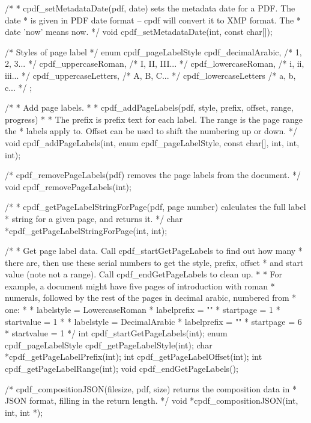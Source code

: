 /*
 * cpdf_setMetadataDate(pdf, date) sets the metadata date for a PDF. The date
 * is given in PDF date format -- cpdf will convert it to XMP format. The
 * date 'now' means now.
 */
void cpdf_setMetadataDate(int, const char[]);

/* Styles of page label */
enum cpdf_pageLabelStyle {
  cpdf_decimalArabic,    /* 1, 2, 3... */
  cpdf_uppercaseRoman,   /* I, II, III... */
  cpdf_lowercaseRoman,   /* i, ii, iii... */
  cpdf_uppercaseLetters, /* A, B, C... */
  cpdf_lowercaseLetters  /* a, b, c... */
};

/*
 * Add page labels.
 *
 * cpdf_addPageLabels(pdf, style, prefix, offset, range, progress)
 *
 * The prefix is prefix text for each label. The range is the page range the
 * labels apply to. Offset can be used to shift the numbering up or down.
 */
void cpdf_addPageLabels(int, enum cpdf_pageLabelStyle, const char[], int, int,
                        int);

/* cpdf_removePageLabels(pdf) removes the page labels from the document. */
void cpdf_removePageLabels(int);

/*
 * cpdf_getPageLabelStringForPage(pdf, page number) calculates the full label
 * string for a given page, and returns it.
 */
char *cpdf_getPageLabelStringForPage(int, int);

/*
 * Get page label data. Call cpdf_startGetPageLabels to find out how many
 * there are, then use these serial numbers to get the style, prefix, offset
 * and start value (note not a range). Call cpdf_endGetPageLabels to clean up.
 *
 * For example, a document might have five pages of introduction with roman
 * numerals, followed by the rest of the pages in decimal arabic, numbered from
 * one:
 *
 * labelstyle = LowercaseRoman
 * labelprefix = ""
 * startpage = 1
 * startvalue = 1
 *
 * labelstyle = DecimalArabic
 * labelprefix = ""
 * startpage = 6
 * startvalue = 1
 */
int cpdf_startGetPageLabels(int);
enum cpdf_pageLabelStyle cpdf_getPageLabelStyle(int);
char *cpdf_getPageLabelPrefix(int);
int cpdf_getPageLabelOffset(int);
int cpdf_getPageLabelRange(int);
void cpdf_endGetPageLabels();

/* cpdf_compositionJSON(filesize, pdf, size) returns the composition data in
 * JSON format, filling in the return length. */
void *cpdf_compositionJSON(int, int, int *);

